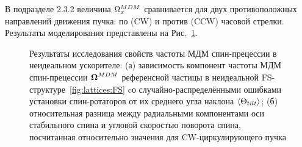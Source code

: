 В подразделе 2.3.2 величина $\Omega_x^{MDM}$ сравнивается для двух противоположных направлений движения пучка:
по (CW) и против (CCW) часовой стрелки. Результаты моделирования представлены на Рис.~\ref{fig:syst:asym}.
\begin{figure}[H]\centering
	\caption{Результаты исследования свойств частоты МДМ спин-прецессии в неидеальном ускорителе:
		(а) зависимость компонент частоты МДМ спин-прецессии $\boldsymbol{\Omega}^{MDM}$ референсной частицы 
		в неидеальной FS-структуре~\ref{fig:lattices:FS} 
		cо случайно-распределёнными ошибками установки спин-ротаторов
		от их среднего угла наклона $\avg{\Theta_{tilt}}$\label{fig:syst:linearity};
		(б) относительная разница между радиальными компонентами оси стабильного спина и угловой скоростью поворота спина, посчитанная относительно значения для CW-циркулирующего пучка\label{fig:syst:asym}
	}
\end{figure}

